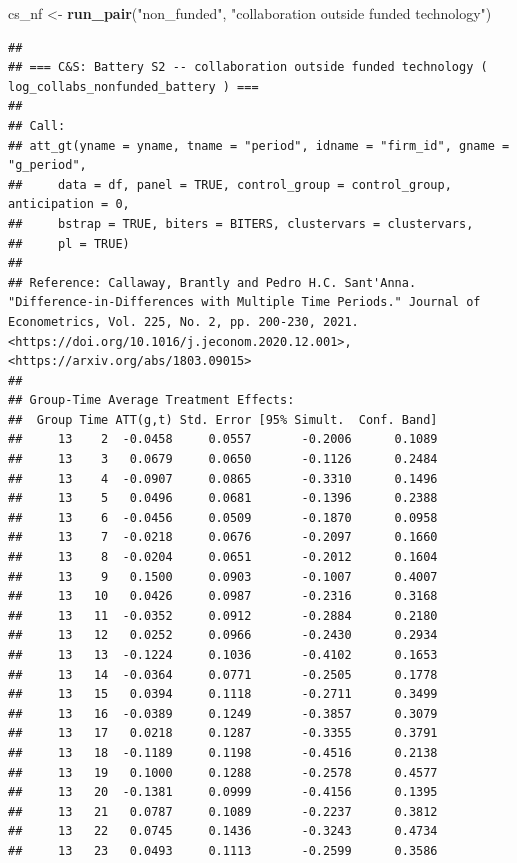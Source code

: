 \documentclass[
]{article}
\newenvironment{Shaded}{\begin{snugshade}}{\end{snugshade}}
\newcommand{\FunctionTok}[1]{\textcolor[rgb]{0.13,0.29,0.53}{\textbf{#1}}}
\newcommand{\NormalTok}[1]{#1}
\newcommand{\OtherTok}[1]{\textcolor[rgb]{0.56,0.35,0.01}{#1}}
\newcommand{\StringTok}[1]{\textcolor[rgb]{0.31,0.60,0.02}{#1}}
\begin{document}
\begin{Shaded}
\begin{Highlighting}[]
\NormalTok{cs\_nf   }\OtherTok{\textless{}{-}} \FunctionTok{run\_pair}\NormalTok{(}\StringTok{"non\_funded"}\NormalTok{,   }\StringTok{"collaboration outside funded technology"}\NormalTok{)}
\end{Highlighting}
\end{Shaded}

\begin{verbatim}
## 
## === C&S: Battery S2 -- collaboration outside funded technology ( log_collabs_nonfunded_battery ) ===
## 
## Call:
## att_gt(yname = yname, tname = "period", idname = "firm_id", gname = "g_period", 
##     data = df, panel = TRUE, control_group = control_group, anticipation = 0, 
##     bstrap = TRUE, biters = BITERS, clustervars = clustervars, 
##     pl = TRUE)
## 
## Reference: Callaway, Brantly and Pedro H.C. Sant'Anna.  "Difference-in-Differences with Multiple Time Periods." Journal of Econometrics, Vol. 225, No. 2, pp. 200-230, 2021. <https://doi.org/10.1016/j.jeconom.2020.12.001>, <https://arxiv.org/abs/1803.09015> 
## 
## Group-Time Average Treatment Effects:
##  Group Time ATT(g,t) Std. Error [95% Simult.  Conf. Band] 
##     13    2  -0.0458     0.0557       -0.2006      0.1089 
##     13    3   0.0679     0.0650       -0.1126      0.2484 
##     13    4  -0.0907     0.0865       -0.3310      0.1496 
##     13    5   0.0496     0.0681       -0.1396      0.2388 
##     13    6  -0.0456     0.0509       -0.1870      0.0958 
##     13    7  -0.0218     0.0676       -0.2097      0.1660 
##     13    8  -0.0204     0.0651       -0.2012      0.1604 
##     13    9   0.1500     0.0903       -0.1007      0.4007 
##     13   10   0.0426     0.0987       -0.2316      0.3168 
##     13   11  -0.0352     0.0912       -0.2884      0.2180 
##     13   12   0.0252     0.0966       -0.2430      0.2934 
##     13   13  -0.1224     0.1036       -0.4102      0.1653 
##     13   14  -0.0364     0.0771       -0.2505      0.1778 
##     13   15   0.0394     0.1118       -0.2711      0.3499 
##     13   16  -0.0389     0.1249       -0.3857      0.3079 
##     13   17   0.0218     0.1287       -0.3355      0.3791 
##     13   18  -0.1189     0.1198       -0.4516      0.2138 
##     13   19   0.1000     0.1288       -0.2578      0.4577 
##     13   20  -0.1381     0.0999       -0.4156      0.1395 
##     13   21   0.0787     0.1089       -0.2237      0.3812 
##     13   22   0.0745     0.1436       -0.3243      0.4734 
##     13   23   0.0493     0.1113       -0.2599      0.3586 

\end{verbatim}
\end{document}
